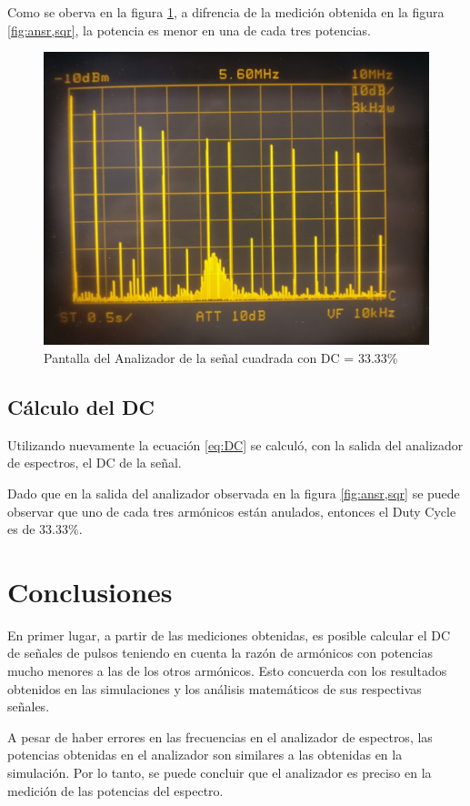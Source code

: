     Como se oberva en la figura \ref{fig:ansr,sqr33}, a difrencia de la medición obtenida
    en la figura \ref{fig:ansr,sqr}, la potencia es menor en una de cada tres potencias.

    \begin{figure}[ht]
        \begin{center}
            \includegraphics[width=0.75\linewidth]{contenido/img/espectro_cuadrada33.jpg}
            \caption{Pantalla del Analizador de la señal cuadrada con DC = 33.33\%}
            \label{fig:ansr,sqr33}
        \end{center}
    \end{figure}

    \subsection{Cálculo del DC}
    Utilizando nuevamente la ecuación \ref{eq:DC} se calculó, con la salida del analizador
    de espectros, el DC de la señal.

    Dado que en la salida del analizador observada en la figura \ref{fig:ansr,sqr}
    se puede observar que uno de cada tres armónicos están anulados, entonces el
    Duty Cycle es de $33.33 \%$.
\section{Conclusiones}

En primer lugar, a partir de las mediciones obtenidas, es posible calcular el DC de señales
de pulsos teniendo en cuenta la razón de armónicos con potencias mucho menores a las de los
otros armónicos. Esto concuerda con los resultados obtenidos en las simulaciones y los análisis
matemáticos de sus respectivas señales.

A pesar de haber errores en las frecuencias en el analizador de espectros, las potencias obtenidas
en el analizador son similares a las obtenidas en la simulación. Por lo tanto, se puede concluir que
el analizador es preciso en la medición de las potencias del espectro.